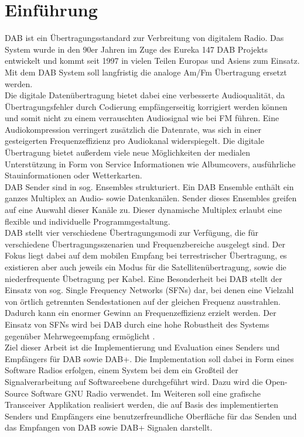 \chapter{Einführung}
\label{sec:intro}
\ac{DAB} ist ein Übertragungsstandard zur Verbreitung von digitalem Radio. Das System wurde in den 90er Jahren im Zuge des Eureka 147 DAB Projekts entwickelt und kommt seit 1997 in vielen Teilen Europas und Asiens zum Einsatz. Mit dem DAB System soll langfristig die analoge Am/Fm Übertragung ersetzt werden.\\
Die digitale Datenübertragung bietet dabei eine verbesserte Audioqualität, da Übertragungsfehler durch Codierung empfängerseitig korrigiert werden können und somit nicht zu einem verrauschten Audiosignal wie bei FM führen. Eine Audiokompression verringert zusätzlich die Datenrate, was sich in einer gesteigerten Frequenzeffizienz pro Audiokanal widerspiegelt. Die digitale Übertragung bietet außerdem viele neue Möglichkeiten der medialen Unterstützung in Form von Service Informationen wie Albumcovers, ausführliche Stauinformationen oder Wetterkarten.\\
DAB Sender sind in sog. Ensembles strukturiert. Ein DAB Ensemble enthält ein ganzes Multiplex an Audio- sowie Datenkanälen. Sender dieses Ensembles greifen auf eine Auswahl dieser Kanäle zu. Dieser dynamische Multiplex erlaubt eine flexible und individuelle Programmgestaltung. \\
DAB stellt vier verschiedene Übertragungsmodi zur Verfügung, die für verschiedene Übertragungsszenarien und Frequenzbereiche ausgelegt sind. Der Fokus liegt dabei auf dem mobilen Empfang bei terrestrischer Übertragung, es existieren aber auch jeweils ein Modus für die Satellitenübertragung, sowie die niederfrequente Übetragung per Kabel. Eine Besonderheit bei DAB stellt der Einsatz von sog. Single Frequency Networks (SFNs) dar, bei denen eine Vielzahl von örtlich getrennten Sendestationen auf der gleichen Frequenz ausstrahlen. Dadurch kann ein enormer Gewinn an Frequenzeffizienz erzielt werden. Der Einsatz von SFNs wird bei DAB durch eine hohe Robustheit des Systems gegenüber Mehrwegeempfang ermöglicht \cite{dab_buch}. \\
Ziel dieser Arbeit ist die Implementierung und Evaluation eines Senders und Empfängers für DAB sowie DAB+. Die Implementation soll dabei in Form eines Software Radios erfolgen, einem System bei dem ein Großteil der Signalverarbeitung auf Softwareebene durchgeführt wird. Dazu wird die Open-Source Software GNU Radio verwendet. Im Weiteren soll eine grafische Transceiver Applikation realisiert werden, die auf Basis des implementierten Senders und Empfängers eine benutzerfreundliche Oberfläche für das Senden und das Empfangen von DAB sowie DAB+ Signalen darstellt.

